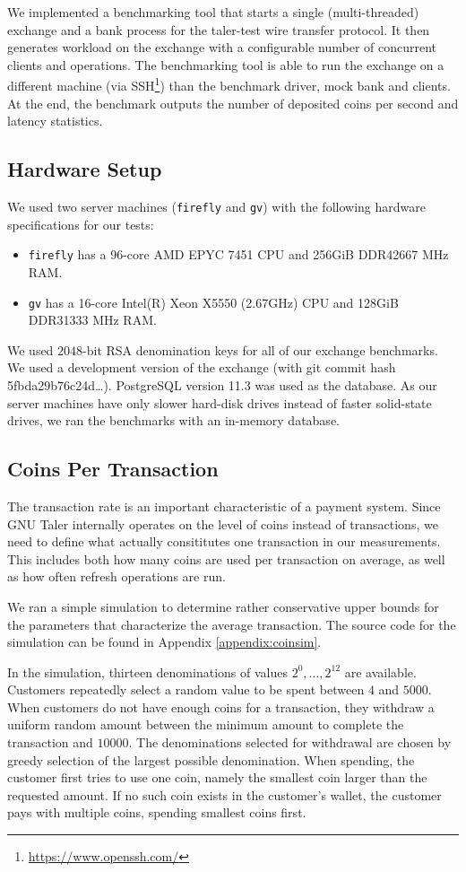 We implemented a benchmarking tool that starts a single (multi-threaded)
exchange and a bank process for the taler-test wire transfer protocol. It then
generates workload on the exchange with a configurable number of concurrent
clients and operations.  The benchmarking tool is able to run the exchange on a
different machine (via SSH\footnote{\url{https://www.openssh.com/}}) than the benchmark driver, mock bank and clients.
At the end, the benchmark outputs the number of deposited coins per second and
latency statistics.

\subsection{Hardware Setup}
We used two server machines (\texttt{firefly} and \texttt{gv}) with the following
hardware specifications for our tests:
\begin{itemize}
  \item \texttt{firefly} has a 96-core AMD EPYC 7451 CPU and 256GiB DDR4\@2667 MHz RAM.
  \item \texttt{gv} has a 16-core Intel(R) Xeon X5550 (2.67GHz) CPU and 128GiB DDR3\@1333 MHz RAM.
\end{itemize}

We used $2048$-bit RSA denomination keys for all of our exchange benchmarks.  We
used a  development version of the exchange (with git commit hash
5fbda29b76c24d\dots).  PostgreSQL version 11.3 was used as the database.
As our server machines have only slower hard-disk drives instead of faster solid-state drives,
we ran the benchmarks with an in-memory database.


\subsection{Coins Per Transaction}\label{sec:coins-per-transaction}
The transaction rate is an important characteristic of a payment system.  Since
GNU Taler internally operates on the level of coins instead of transactions, we
need to define what actually consititutes one transaction in our measurements.
This includes both how many coins are used per transaction on average, as well
as how often refresh operations are run.

We ran a simple simulation to determine rather conservative upper bounds for
the parameters that characterize the average transaction.  The source code for
the simulation can be found in Appendix \ref{appendix:coinsim}.

In the simulation, thirteen denominations of values $2^0,\dots,2^{12}$ are
available.  Customers repeatedly select a random value to be spent between $4$ and $5000$.
When customers do not have enough coins for a transaction, they withdraw a
uniform random amount between the minimum amount to complete the transaction
and $10000$.  The denominations selected for withdrawal are chosen by greedy
selection of the largest possible denomination.  When spending, the customer
first tries to use one coin, namely the smallest coin larger than the
requested amount.  If no such coin exists in the customer's wallet, the
customer pays with multiple coins, spending smallest coins first.

